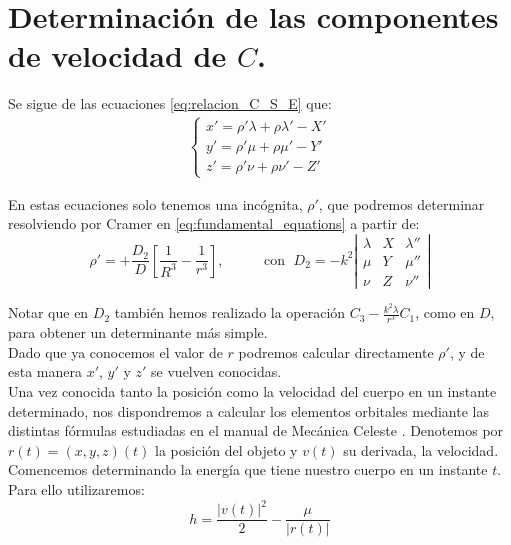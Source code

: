 \section{Determinación de las componentes de velocidad de $C$.}
\label{sec:velocity_component}
Se sigue de las ecuaciones \eqref{eq:relacion_C_S_E} que:
\begin{align}
\left\{
\begin{array}{l}
	x'=\rho'\lambda+\rho\lambda'-X'\\
	y'=\rho'\mu+\rho\mu'-Y'\\
	z'=\rho'\nu+\rho\nu'-Z'
\end{array}
\right.
\label{eq:relacion_C_S_E_derivada}
\end{align}

En estas ecuaciones solo tenemos una incógnita, $\rho'$, que podremos determinar resolviendo por Cramer en \eqref{eq:fundamental_equations} a partir de:
\[
\rho'=+\frac{D_2}{D}[\frac{1}{R^3}-\frac{1}{r^3}],
\; \; \; \; \; \; \; \; \; \text{ con } \;
D_2 = -k^2
\left|
\begin{array}{ccc}
\lambda & X & \lambda''\\
\mu & Y & \mu''\\
\nu & Z & \nu''
\end{array}
\right|
\]

Notar que en $D_2$ también hemos realizado la operación $C_3-\frac{k^2\lambda}{r^3}C_1$, como en $D$, para obtener un determinante más simple.\\

Dado que ya conocemos el valor de $r$ podremos calcular directamente $\rho'$, y de esta manera $x'$, $y'$ y $z'$ se vuelven conocidas. \cite{moulton}\\






\label{sec:elements_determination}
Una vez conocida tanto la posición como la velocidad del cuerpo en un instante determinado, nos dispondremos a calcular los elementos orbitales mediante las distintas fórmulas estudiadas en el manual de Mecánica Celeste \cite{ortega}. Denotemos por $r(t)=(x,y,z)(t)$ la posición del objeto y $v(t)$ su derivada, la velocidad.\\

Comencemos determinando la energía que tiene nuestro cuerpo en un instante $t$. Para ello utilizaremos:
\[
h=\frac{|v(t)|^2}{2}-\frac{\mu}{|r(t)|}
\]

